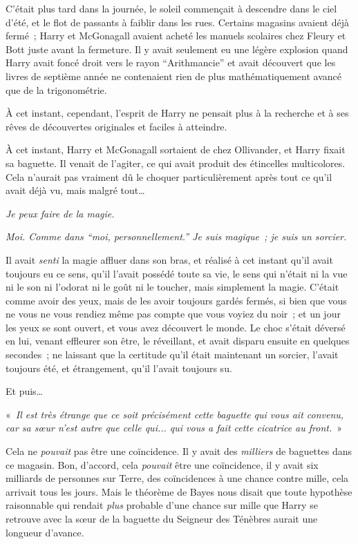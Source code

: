 \later

C'était plus tard dans la journée, le soleil commençait à descendre dans le ciel d'été, et le flot de passants à faiblir dans les rues.
Certains magasins avaient déjà fermé~; Harry et McGonagall avaient acheté les manuels scolaires chez Fleury et Bott juste avant la fermeture.
Il y avait seulement eu une légère explosion quand Harry avait foncé droit vers le rayon “Arithmancie” et avait découvert que les livres de septième année ne contenaient rien de plus mathématiquement avancé que de la trigonométrie.

À cet instant, cependant, l'esprit de Harry ne pensait plus à la recherche et à ses rêves de découvertes originales et faciles à atteindre.

À cet instant, Harry et McGonagall sortaient de chez Ollivander, et Harry fixait sa baguette.
Il venait de l'agiter, ce qui avait produit des étincelles multicolores.
Cela n'aurait pas vraiment dû le choquer particulièrement après tout ce qu'il avait déjà vu, mais malgré tout…

\emph{Je peux faire de la magie.}

\emph{Moi. Comme dans “moi, personnellement.” Je suis magique~; je suis un sorcier.}

Il avait \emph{senti} la magie affluer dans son bras, et réalisé à cet instant qu'il avait toujours eu ce sens, qu'il l'avait possédé toute sa vie, le sens qui n'était ni la vue ni le son ni l'odorat ni le goût ni le toucher, mais simplement la magie.
C'était comme avoir des yeux, mais de les avoir toujours gardés fermés, si bien que vous ne vous ne vous rendiez même pas compte que vous voyiez du noir~;
et un jour les yeux se sont ouvert, et vous avez découvert le monde.
Le choc s'était déversé en lui, venant effleurer son être, le réveillant, et avait disparu ensuite en quelques secondes~;
ne laissant que la certitude qu'il était maintenant un sorcier, l'avait toujours été,
et étrangement, qu'il l'avait toujours su.

Et puis…

«~\emph{Il est très étrange que ce soit précisément cette baguette qui vous ait convenu, car sa sœur n'est autre que celle qui... qui vous a fait cette cicatrice au front.}~»

Cela ne \emph{pouvait} pas être une coïncidence.
Il y avait des \emph{milliers} de baguettes dans ce magasin.
Bon, d'accord, cela \emph{pouvait} être une coïncidence, il y avait six milliards de personnes sur Terre, des coïncidences à une chance contre mille, cela arrivait tous les jours.
Mais le théorème de Bayes nous disait que toute hypothèse raisonnable
qui rendait \emph{plus} probable d'une chance sur mille que Harry se retrouve avec la sœur de la baguette du Seigneur des Ténèbres aurait une longueur d'avance.

